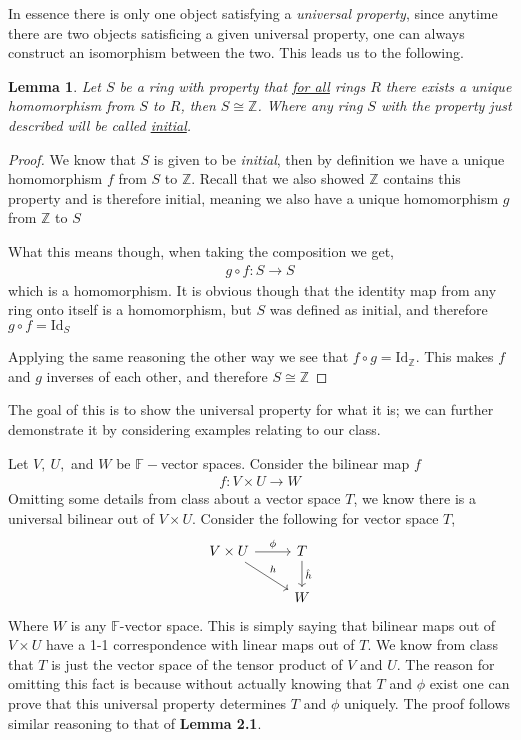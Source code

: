 \documentclass[12pt]{article}
\newtheorem{lem}[thm]{Lemma}
\theoremstyle{definition}
\theoremstyle{remark}
\newcommand      {\Zm}         {{\mathbb Z}}
\newcommand      {\Fm}          {{\mathbb F}}
\begin{document}
In essence there is only one object satisfying a \textit{universal property}, since anytime there are two objects satisficing a given universal property, one can always construct an isomorphism between the two. This leads us to the following.
\newpage
\begin{lem}
    Let $S$ be a ring with property that \underline{for all} rings $R$ there exists a unique homomorphism from $S$ to $R$, then $S\cong \Zm$. Where any ring $S$ with the property just described will be called \underline{initial}.
\end{lem}
\begin{proof}
    We know that $S$ is given to be \textit{initial}, then by definition we have a unique homomorphism $f$ from $S$ to $\Zm$. 
    Recall that we also showed $\Zm$ contains this property and is therefore initial, meaning we also have a unique homomorphism $g$ from $\Zm$ to $S$

    What this means though, when taking the composition we get,
    \begin{align*}
        g\circ f: S \to S
    \end{align*}
    which is a homomorphism. It is obvious though that the identity map from any ring onto itself is a homomorphism, but $S$ was defined as initial, and therefore $g\circ f = \text{Id}_S$

    Applying the same reasoning the other way we see that $f \circ g = \text{Id}_\Zm$. This makes $f$ and $g$ inverses of each other, and therefore $S \cong \Zm$
\end{proof}

The goal of this is to show the universal property for what it is; we can further demonstrate it by considering examples relating to our class. 

\vspace{.5cm}
Let $V,\ U,$ and $W$ be $\Fm-$vector spaces. Consider the bilinear map $f$
\begin{align*}
    f: V\times U \to W
\end{align*}
Omitting some details from class about a vector space $T$, we know there is a universal bilinear out of $V\times U$. Consider the following for vector space $T$,
\[\begin{tikzcd}
    {V\times U} & T \\
    &{W} 
    \arrow["\phi", from=1-1, to=1-2]
    \arrow["h", from=1-1, to=2-2] 
    \arrow["\hat{h}", from=1-2, to=2-2]
\end{tikzcd}\]
Where $W$ is any $\Fm$-vector space. This is simply saying that bilinear maps out of $V\times U$ have a 1-1 correspondence with linear maps out of $T$. We know from class that $T$ is just the vector space of the tensor product of $V$ and $U$. The reason for omitting this fact is because without actually knowing that $T$ and $\phi$ exist one can prove that this universal property determines $T$ and $\phi$ uniquely. The proof follows similar reasoning to that of \textbf{Lemma 2.1}.
\end{document}
